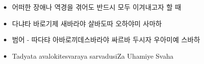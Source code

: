 \documentclass[12pt, a4paper, oneside]{book}
\begin{document}
	 		\begin{itemize}
			\item 어떠한 장애나 역경을 겪어도 반드시 모두 이겨내고자 할 때
			\item 다냐타 바로기제 새바라야 살바도따 오하야미 사마하
			\item 범어 - 따다탸 아바로끼데스바라야 싸르바 두시자 우아미예 스바하
			\item Tadyata avalokitesvaraya sarvadusiZa Uhamiye Svaha
			\end{itemize}



 

\end{document}
